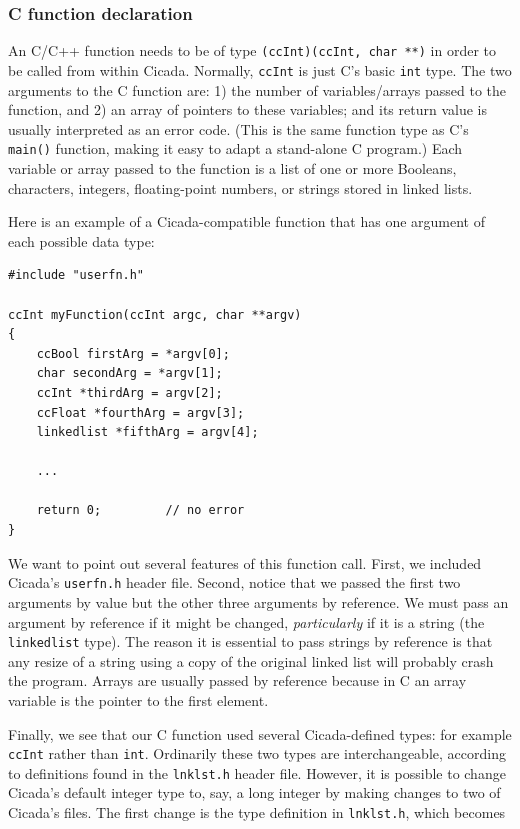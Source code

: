 \documentclass{article}
\newenvironment{code}{
       \begin{list}{}{
               \setlength{\leftmargin}{.4in}
               \setlength{\rightmargin}{0in}
               \setlength{\topsep}{.2in}
       }
       \small
       \item[] }
       { \end{list}   }
\begin{document}
\subsubsection{C function declaration}

An C/C++ function needs to be of type \verb#(ccInt)(ccInt, char **)# in order to be called from within Cicada.  Normally, \verb#ccInt# is just C's basic \verb#int# type.  The two arguments to the C function are:  1) the number of variables/arrays passed to the function, and 2) an array of pointers to these variables; and its return value is usually interpreted as an error code.  (This is the same function type as C's \verb#main()# function, making it easy to adapt a stand-alone C program.)  Each variable or array passed to the function is a list of one or more Booleans, characters, integers, floating-point numbers, or strings stored in linked lists.

Here is an example of a Cicada-compatible function that has one argument of each possible data type:

\begin{code} \begin{verbatim}
#include "userfn.h"

ccInt myFunction(ccInt argc, char **argv)
{
    ccBool firstArg = *argv[0];
    char secondArg = *argv[1];
    ccInt *thirdArg = argv[2];
    ccFloat *fourthArg = argv[3];
    linkedlist *fifthArg = argv[4];
    
    ...
    
    return 0;         // no error
}
\end{verbatim} \end{code}

\noindent We want to point out several features of this function call.  First, we included Cicada's \verb#userfn.h# header file.  Second, notice that we passed the first two arguments by value but the other three arguments by reference.  We must pass an argument by reference if it might be changed, \emph{particularly} if it is a string (the \verb#linkedlist# type).  The reason it is essential to pass strings by reference is that any resize of a string using a copy of the original linked list will probably crash the program.  Arrays are usually passed by reference because in C an array variable is the pointer to the first element.

Finally, we see that our C function used several Cicada-defined types:  for example \verb#ccInt# rather than \verb#int#.  Ordinarily these two types are interchangeable, according to definitions found in the \verb#lnklst.h# header file.  However, it is possible to change Cicada's default integer type to, say, a long integer by making changes to two of Cicada's files.  The first change is the type definition in \verb#lnklst.h#, which becomes
\end{document}
